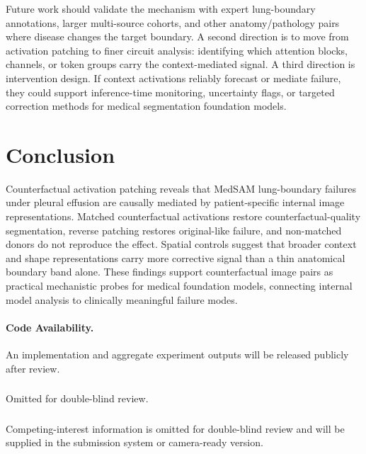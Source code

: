 \documentclass[runningheads]{llncs}
\begin{document}
Future work should validate the mechanism with expert lung-boundary annotations, larger multi-source cohorts, and other anatomy/pathology pairs where disease changes the target boundary. A second direction is to move from activation patching to finer circuit analysis: identifying which attention blocks, channels, or token groups carry the context-mediated signal. A third direction is intervention design. If context activations reliably forecast or mediate failure, they could support inference-time monitoring, uncertainty flags, or targeted correction methods for medical segmentation foundation models.

\section{Conclusion}

Counterfactual activation patching reveals that MedSAM lung-boundary failures under pleural effusion are causally mediated by patient-specific internal image representations. Matched counterfactual activations restore counterfactual-quality segmentation, reverse patching restores original-like failure, and non-matched donors do not reproduce the effect. Spatial controls suggest that broader context and shape representations carry more corrective signal than a thin anatomical boundary band alone. These findings support counterfactual image pairs as practical mechanistic probes for medical foundation models, connecting internal model analysis to clinically meaningful failure modes.

\paragraph{Code Availability.}
An implementation and aggregate experiment outputs will be released publicly after review.

\begin{credits}
\subsubsection{\ackname}
Omitted for double-blind review.

\subsubsection{\discintname}
Competing-interest information is omitted for double-blind review and will be supplied in the submission system or camera-ready version.
\end{credits}
\end{document}
